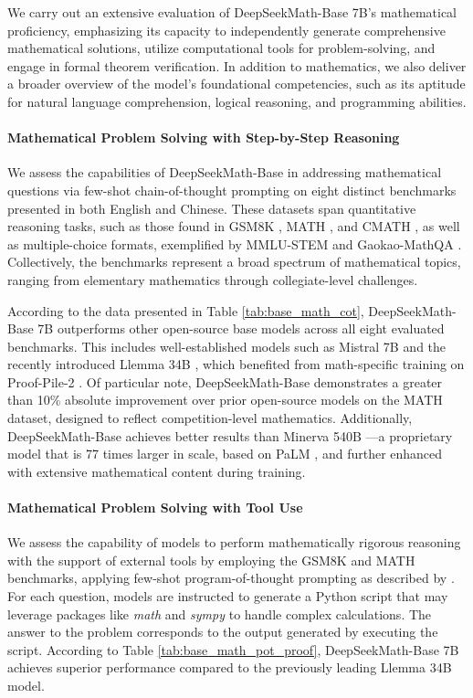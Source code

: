 \begin{itemize}[topsep=0pt]
We carry out an extensive evaluation of DeepSeekMath-Base 7B's mathematical proficiency, emphasizing its capacity to independently generate comprehensive mathematical solutions, utilize computational tools for problem-solving, and engage in formal theorem verification. In addition to mathematics, we also deliver a broader overview of the model's foundational competencies, such as its aptitude for natural language comprehension, logical reasoning, and programming abilities.

\paragraph{Mathematical Problem Solving with Step-by-Step Reasoning}

We assess the capabilities of DeepSeekMath-Base in addressing mathematical questions via few-shot chain-of-thought prompting \citep{cot} on eight distinct benchmarks presented in both English and Chinese. These datasets span quantitative reasoning tasks, such as those found in GSM8K \citep{gsm8k}, MATH \citep{MATH}, and CMATH \citep{wei2023cmath}, as well as multiple-choice formats, exemplified by MMLU-STEM \citep{mmlu} and Gaokao-MathQA \citep{agieval}. Collectively, the benchmarks represent a broad spectrum of mathematical topics, ranging from elementary mathematics through collegiate-level challenges.

According to the data presented in Table \ref{tab:base_math_cot}, DeepSeekMath-Base 7B outperforms other open-source base models across all eight evaluated benchmarks. This includes well-established models such as Mistral 7B \citep{mistral} and the recently introduced Llemma 34B \citep{llemma}, which benefited from math-specific training on Proof-Pile-2 \citep{llemma}. Of particular note, DeepSeekMath-Base demonstrates a greater than 10\% absolute improvement over prior open-source models on the MATH dataset, designed to reflect competition-level mathematics. Additionally, DeepSeekMath-Base achieves better results than Minerva 540B \citep{minerva}—a proprietary model that is 77 times larger in scale, based on PaLM \citep{palm}, and further enhanced with extensive mathematical content during training.

\paragraph{Mathematical Problem Solving with Tool Use} We assess the capability of models to perform mathematically rigorous reasoning with the support of external tools by employing the GSM8K and MATH benchmarks, applying few-shot program-of-thought prompting as described by \citep{pot,pal}. For each question, models are instructed to generate a Python script that may leverage packages like \textit{math} and \textit{sympy} to handle complex calculations. The answer to the problem corresponds to the output generated by executing the script. According to Table \ref{tab:base_math_pot_proof}, DeepSeekMath-Base 7B achieves superior performance compared to the previously leading Llemma 34B model.


\end{itemize}
